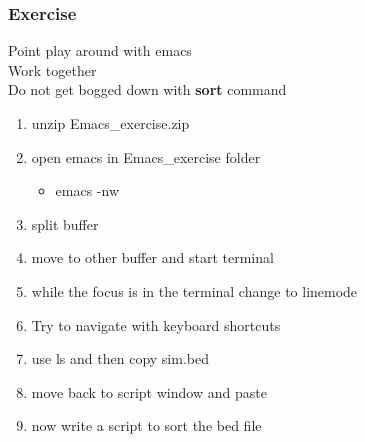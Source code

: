 \documentclass[t,10pt]{beamer}
\begin{document}
\begin{frame}
\frametitle{Exercise}
\label{sec-5-2}

Point play around with emacs \\ Work together \\ Do not get bogged down with \textbf{sort} command 
\vspace{0.25in}

\begin{enumerate}
\item unzip Emacs\_exercise.zip
\item open emacs in Emacs\_exercise folder
\begin{itemize}
\item emacs -nw
\end{itemize}
\item split buffer
\item move to other buffer and start terminal
\item while the focus is in the terminal change to linemode
\item Try to navigate with keyboard shortcuts
\item use ls and then copy sim.bed
\item move back to script window and paste
\item now write a script to sort the bed file
\end{enumerate}
 
\end{frame}
\end{document}
